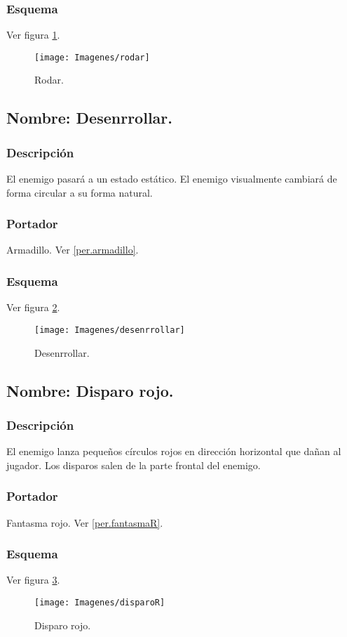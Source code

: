 \documentclass[11pt,letterpaper]{article}
\begin{document}
		\subsubsection{Esquema}
		Ver figura \ref{fig:rodar}.
		\begin{figure}
			\centering
			\texttt{[image: Imagenes/rodar]}
			\caption{Rodar.}
			\label{fig:rodar}
		\end{figure}
	\subsection{Nombre: Desenrrollar.} \label{hab.desenrrollar}
		\subsubsection{Descripción}
		El enemigo pasará a un estado estático. El enemigo visualmente cambiará de forma circular a su forma natural.
		\subsubsection{Portador}
		Armadillo. Ver \ref{per.armadillo}.
		\subsubsection{Esquema}
		Ver figura \ref{fig:desenrrollar}.
		\begin{figure}
			\centering
			\texttt{[image: Imagenes/desenrrollar]}
			\caption{Desenrrollar.}
			\label{fig:desenrrollar}
		\end{figure}
	\subsection{Nombre: Disparo rojo.} \label{hab.disparoR}
		\subsubsection{Descripción}
		El enemigo lanza pequeños círculos rojos en dirección horizontal que dañan al jugador. Los disparos salen de la parte frontal del enemigo.
		\subsubsection{Portador}
		Fantasma rojo. Ver \ref{per.fantasmaR}.
		\subsubsection{Esquema}
		Ver figura \ref{fig:disparoR}.
		\begin{figure}
			\centering
			\texttt{[image: Imagenes/disparoR]}
			\caption{Disparo rojo.}
			\label{fig:disparoR}
		\end{figure}
\end{document}
